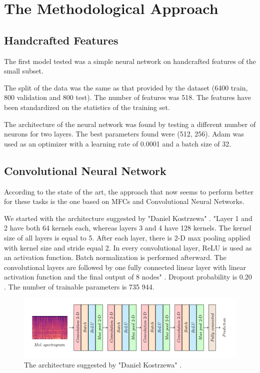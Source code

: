 \section{The Methodological Approach}


\subsection{Handcrafted Features}
The first model tested was a simple neural network on handcrafted features of the small subset.

The split of the data was the same as that provided by the dataset (6400 train, 800 validation and 800 test).
The number of features was 518. The features have been standardized on the statistics of the training set.

The architecture of the neural network was found by testing a different number of neurons for two layers. 
The best parameters found were (512, 256).
Adam was used as an optimizer with a learning rate of 0.0001 and a batch size of 32.

\subsection{Convolutional Neural Network}
According to the state of the art\cite{zeng2019spectrogram}, the approach that now seems to perform better for these tasks is the one based on MFCs and Convolutional Neural Networks. 

We started with the architecture suggested by "Daniel Kostrzewa" \cite{kostrzewa2021music}.
"Layer 1 and 2 have both 64 kernels each, whereas layers 3 and 4 have 128 kernels. The kernel size of all layers is equal to 5. After each layer, there is 2-D max pooling applied with kernel size and stride equal 2. In every convolutional layer, ReLU is used as an activation function. Batch normalization is performed afterward. The convolutional layers are followed by one fully connected linear layer with linear activation function and the final output of 8 nodes" \cite{kostrzewa2021music}. Dropout probability is 0.20 . The number of trainable parameters is 735 944.

\begin{figure}[ht]
\centering
\includegraphics[scale=0.6]{images/CNN-architecture.png}
\caption{The architecture suggested by "Daniel Kostrzewa" \cite{kostrzewa2021music}.}
\label{fig:CNN-architecture}
\end{figure}

